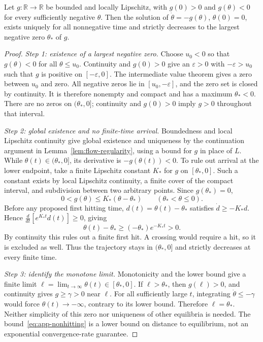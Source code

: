 \begin{lemma}
\label{lem:scalar-flow}
Let $g:\mathbb R\to\mathbb R$ be bounded and locally Lipschitz, with
$g(0)>0$ and $g(\theta)<0$ for every sufficiently negative $\theta$.
Then the solution of $\dot\theta=-g(\theta)$, $\theta(0)=0$, exists uniquely
for all nonnegative time and strictly decreases to the largest negative
zero $\theta_*$ of $g$.
\end{lemma}
\begin{proof}
\textit{Step 1: existence of a largest negative zero.}
Choose $u_0<0$ so that $g(\theta)<0$ for all $\theta\leq u_0$.
Continuity and $g(0)>0$ give an $\varepsilon>0$ with
$-\varepsilon>u_0$ such that $g$ is positive on $[-\varepsilon,0]$.
The intermediate value theorem gives a zero between $u_0$ and zero.
All negative zeros lie in $[u_0,-\varepsilon]$, and the zero set is closed
by continuity. It is therefore nonempty and compact and has a maximum
$\theta_*<0$. There are no zeros on $(\theta_*,0]$; continuity and
$g(0)>0$ imply $g>0$ throughout that interval.

\textit{Step 2: global existence and no finite-time arrival.}
Boundedness and local Lipschitz continuity give global existence and
uniqueness by the continuation argument in Lemma~\ref{lem:flow-regularity},
using a bound for $g$ in place of $L$. While $\theta(t)\in(\theta_*,0]$,
its derivative is $-g(\theta(t))<0$. To rule out arrival at the lower
endpoint, take a finite Lipschitz constant $K_*$ for $g$ on $[\theta_*,0]$.
Such a constant exists by local Lipschitz continuity, a finite cover of
the compact interval, and subdivision between two arbitrary points.
Since $g(\theta_*)=0$,
\[
 0<g(\theta)\leq K_*(\theta-\theta_*)
 \qquad(\theta_*<\theta\leq0).
\]
Before any proposed first hitting time, $d(t)=\theta(t)-\theta_*$ satisfies
$\dot d\geq-K_*d$. Hence
$\frac{d}{dt}[e^{K_*t}d(t)]\geq0$, giving
\begin{equation}
 \theta(t)-\theta_*\geq(-\theta_*)e^{-K_*t}>0.
 \label{eq:app-nonhitting}
\end{equation}
By continuity this rules out a finite first hit. A crossing would require
a hit, so it is excluded as well. Thus the trajectory stays in
$(\theta_*,0]$ and strictly decreases at every finite time.

\textit{Step 3: identify the monotone limit.}
Monotonicity and the lower bound give a finite limit
$\ell=\lim_{t\to\infty}\theta(t)\in[\theta_*,0]$. If $\ell>\theta_*$,
then $g(\ell)>0$, and continuity gives $g\geq\gamma>0$ near $\ell$.
For all sufficiently large $t$, integrating $\dot\theta\leq-\gamma$
would force $\theta(t)\to-\infty$, contrary to its lower bound. Therefore
$\ell=\theta_*$. Neither simplicity of this zero nor uniqueness of other
equilibria is needed. The bound~\eqref{eq:app-nonhitting} is a lower bound
on distance to equilibrium, not an exponential convergence-rate guarantee.
\end{proof}


